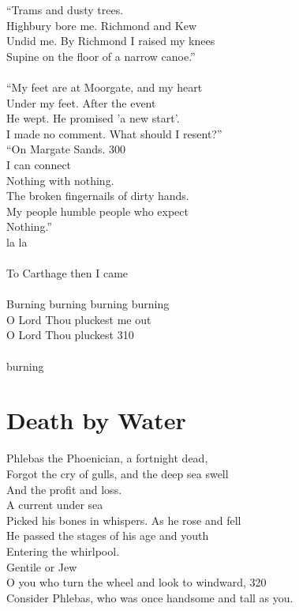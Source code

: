 \documentclass{article}
\begin{document}
``Trams and dusty trees. \\
Highbury bore me. Richmond and Kew \\
Undid me. By Richmond I raised my knees \\
Supine on the floor of a narrow canoe.'' \\
 \\
``My feet are at Moorgate, and my heart \\
Under my feet. After the event \\
He wept. He promised 'a new start'. \\
I made no comment. What should I resent?'' \\
``On Margate Sands.                                               \hfill  300 \\
I can connect \\
Nothing with nothing. \\
The broken fingernails of dirty hands. \\
My people humble people who expect \\
Nothing.'' \\
\indent     la la \\
 \\
To Carthage then I came \\
 \\
Burning burning burning burning \\
O Lord Thou pluckest me out \\
O Lord Thou pluckest                                             \hfill 310 \\
 \\
burning \\

\section{Death by Water}

Phlebas the Phoenician, a fortnight dead, \\
Forgot the cry of gulls, and the deep sea swell \\
And the profit and loss. \\
\hspace*{2.2in} A current under sea \\
Picked his bones in whispers. As he rose and fell \\
He passed the stages of his age and youth \\
Entering the whirlpool. \\
\hspace*{2in} Gentile or Jew \\
O you who turn the wheel and look to windward,                   \hfill 320 \\
Consider Phlebas, who was once handsome and tall as you. \\
\end{document}
